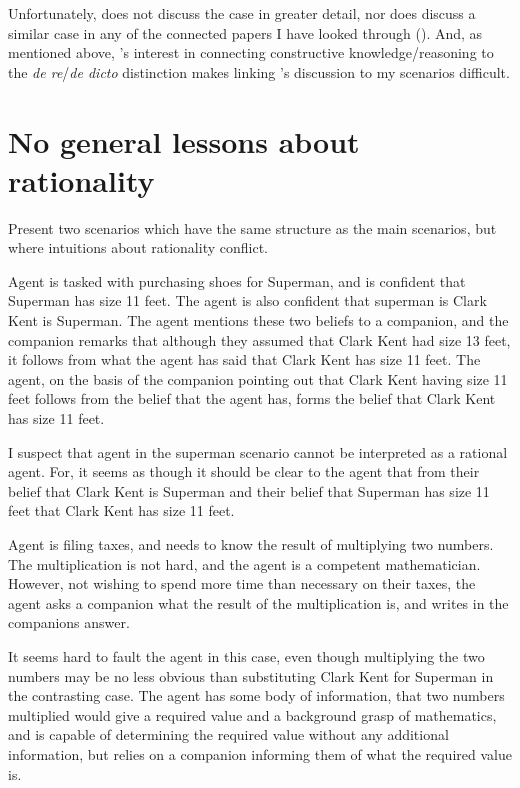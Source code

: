 \documentclass[10pt]{article}
\begin{document}
Unfortunately, \citeauthor{Over:1983ab} does not discuss the case in greater detail, nor does \citeauthor{Over:1983ab} discuss a similar case in any of the connected papers I have looked through (\citeyear{Millican:1990aa,Over:1987aa,Over:1986aa,Over:1985aa,Over:1983ab,Over:1983aa}).
And, as mentioned above, \citeauthor{Over:1983ab}'s interest in connecting constructive knowledge/reasoning to the \emph{de re}/\emph{de dicto} distinction makes linking \citeauthor{Over:1983ab}'s discussion to my scenarios difficult.

\section{No general lessons about rationality}
\label{sec:no-general-lessons}

Present two scenarios which have the same structure as the main scenarios, but where intuitions about rationality conflict.

\begin{scenario}[Superman]
  Agent is tasked with purchasing shoes for Superman, and is confident that Superman has size 11 feet.
  The agent is also confident that superman is Clark Kent is Superman.
  The agent mentions these two beliefs to a companion, and the companion remarks that although they assumed that Clark Kent had size 13 feet, it follows from what the agent has said that Clark Kent has size 11 feet.
  The agent, on the basis of the companion pointing out that Clark Kent having size 11 feet follows from the belief that the agent has, forms the belief that Clark Kent has size 11 feet.
\end{scenario}

I suspect that agent in the superman scenario cannot be interpreted as a rational agent.
For, it seems as though it should be clear to the agent that from their belief that Clark Kent is Superman and their belief that Superman has size 11 feet that Clark Kent has size 11 feet.

\begin{scenario}[Calculator]
  Agent is filing taxes, and needs to know the result of multiplying two numbers.
  The multiplication is not hard, and the agent is a competent mathematician.
  However, not wishing to spend more time than necessary on their taxes, the agent asks a companion what the result of the multiplication is, and writes in the companions answer.
\end{scenario}

It seems hard to fault the agent in this case, even though multiplying the two numbers may be no less obvious than substituting Clark Kent for Superman in the contrasting case.
The agent has some body of information, that two numbers multiplied would give a required value and a background grasp of mathematics, and is capable of determining the required value without any additional information, but relies on a companion informing them of what the required value is.
\end{document}
